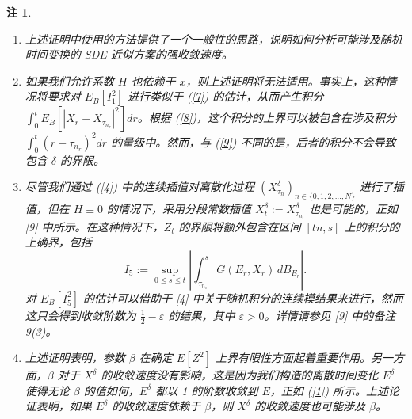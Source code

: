 \documentclass[12pt,final]{article}
\numberwithin{equation}{section}
\numberwithin{figure}{section}
\numberwithin{table}{section}
\theoremstyle{plain}
\newtheorem{remark}{注}[section]
\begin{document}
	\begin{remark}
		
		\begin{enumerate}
			\item 上述证明中使用的方法提供了一个一般性的思路，说明如何分析可能涉及随机时间变换的 SDE 近似方案的强收敛速度。
			\item 如果我们允许系数 \( H \) 也依赖于 \( x \)，则上述证明将无法适用。事实上，这种情况将要求对 \( E_{B}\left[I_{1}^{2}\right] \) 进行类似于 (\ref{7}) 的估计，从而产生积分 \( \int_{0}^{t}E_{B}\left[\left|X_{r}-X_{\tau_{n_{r}}}\right|^{2}\right] dr \)。根据 (\ref{8})，这个积分的上界可以被包含在涉及积分 \( \int_{0}^{t}(r-\tau_{n_{r}})^{2}dr \) 的量级中。然而，与 (\ref{9}) 不同的是，后者的积分不会导致包含 \( \delta \) 的界限。
			\item 尽管我们通过 (\ref{4}) 中的连续插值对离散化过程 \( \left(X_{\tau_{n}}^{\delta}\right)_{n\in\{0,1,2,\ldots, N\}} \) 进行了插值，但在 \( H\equiv 0 \) 的情况下，采用分段常数插值 \( X_{t}^{\delta}:=X_{\tau_{n_{t}}}^{\delta} \) 也是可能的，正如 [9] 中所示。在这种情况下，\( Z_t \) 的界限将额外包含在区间 \([tn,s]\) 上的积分的上确界，包括
			\[
			I_{5}:=\sup_{0\leq s\leq t}\left|\int_{\tau_{n_{s}}}^{s}G(E_{r},X_{r})\, dB_{E_{r}}\right|.
			\]
			对 \( E_{B}[I_{5}^{2}] \) 的估计可以借助于 [4] 中关于随机积分的连续模结果来进行，然而这只会得到收敛阶数为 \( \frac{1}{2}-\varepsilon \) 的结果，其中 \( \varepsilon > 0 \)。详情请参见 [9] 中的备注 9(3)。
			\item 上述证明表明，参数 \( \beta \) 在确定 \( E[Z^2] \) 上界有限性方面起着重要作用。另一方面，\( \beta \) 对于 \( X^{\delta} \) 的收敛速度没有影响，这是因为我们构造的离散时间变化 \( E^{\delta} \) 使得无论 \( \beta \) 的值如何，\( E^{\delta} \) 都以 1 的阶数收敛到 \( E \)，正如 (\ref{1}) 所示。上述论证表明，如果 \( E^{\delta} \) 的收敛速度依赖于 \( \beta \)，则 \( X^{\delta} \) 的收敛速度也可能涉及 \( \beta \)。
		\end{enumerate}
	\end{remark}
	
	
	
	
	
\end{document}
